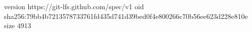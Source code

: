 version https://git-lfs.github.com/spec/v1
oid sha256:79bb4b7213578733761fd435d741d39bed0f4e800266c70b56ee623d228e810e
size 4913
